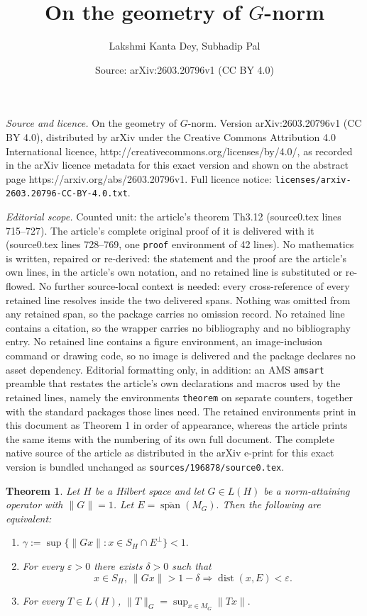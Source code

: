 \documentclass[10pt,a4paper]{amsart}
\title{On the geometry of $G$-norm}
\author{Lakshmi Kanta Dey, Subhadip Pal}
\date{Source: arXiv:2603.20796v1 (CC BY 4.0)}
\newtheorem{theorem}{Theorem}
\begin{document}
\maketitle

\noindent\emph{Source and licence.} On the geometry of $G$-norm. Version arXiv:2603.20796v1 (CC BY 4.0), distributed by arXiv under the Creative Commons Attribution 4.0 International licence, http://creativecommons.org/licenses/by/4.0/, as recorded in the arXiv licence metadata for this exact version and shown on the abstract page https://arxiv.org/abs/2603.20796v1. Full licence notice: \texttt{licenses/arxiv-2603.20796-CC-BY-4.0.txt}.\par\smallskip

\noindent\textit{Editorial scope.} Counted unit: the article's theorem Th3.12 (source0.tex lines 715--727). The article's complete original proof of it is delivered with it (source0.tex lines 728--769, one \texttt{proof} environment of 42 lines). No mathematics is written, repaired or re-derived: the statement and the proof are the article's own lines, in the article's own notation, and no retained line is substituted or re-flowed.  No further source-local context is needed: every cross-reference of every retained line resolves inside the two delivered spans.  Nothing was omitted from any retained span, so the package carries no omission record.  No retained line contains a citation, so the wrapper carries no bibliography and no bibliography entry.  No retained line contains a figure environment, an image-inclusion command or drawing code, so no image is delivered and the package declares no asset dependency.  Editorial formatting only, in addition: an AMS \texttt{amsart} preamble that restates the article's own declarations and macros used by the retained lines, namely the environments \texttt{theorem} on separate counters, together with the standard packages those lines need.  The retained environments print in this document as Theorem 1 in order of appearance, whereas the article prints the same items with the numbering of its own full document.  The complete native source of the article as distributed in the arXiv e-print for this exact version is bundled unchanged as \texttt{sources/196878/source0.tex}.
	\begin{theorem}\label{Th3.12}
		Let $H$ be a Hilbert space and let 
		$G \in L(H)$ be a norm-attaining operator with $\|G\|=1$. Let $E = \overline{\operatorname{span}}(M_G).$ Then the following are equivalent:
		\begin{enumerate}
			\item[(i)] $\gamma := \sup\{\|Gx\| : x \in S_H \cap E^\perp\} < 1.$
			\item[(ii)] For every $\varepsilon>0$ there exists $\delta>0$ such that
			\[
			x\in S_H,\ \|Gx\|>1-\delta \Longrightarrow \operatorname{dist}(x,E)<\varepsilon.
			\]
			\item[(iii)] For every $T\in L(H)$,
			$\|T\|_G = \sup_{x\in M_G}\|Tx\|.$
		\end{enumerate}
	\end{theorem}
\end{document}
